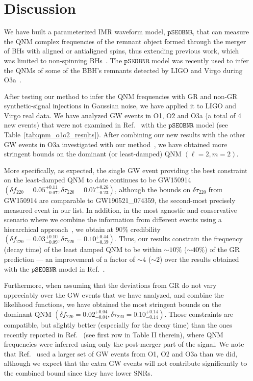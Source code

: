 \documentclass[twocolumn,prd,aps,superscriptaddress,preprintnumbers,tightenlines,showpacs,nofootinbib,eqsecnum,amsfonts,amsmath]{revtex4-1}
\newcommand{\df}[1]{\delta f_{\text{#1}}}
\newcommand{\dtau}[1]{\delta \tau_{\text{#1}}}
\newcommand{\pSEOB}{\texttt{pSEOBNR}}
\begin{document}



\section{Discussion}
\label{sec:discussion}
We have built a parameterized IMR waveform model, $\pSEOB$, that can 
measure the QNM complex frequencies of the remnant object formed through 
the merger of BHs with aligned or antialigned spins, thus extending  
previous work, which was limited to non-spinning BHs~\cite{Brito:2018rfr}. 
The $\pSEOB$ model was recently used to infer the QNMs of some of the 
BBH's remnants detected by LIGO and Virgo during O3a~\cite{Abbott:2020jks}. 

After testing our method to infer the QNM frequencies with GR and non-GR synthetic-signal 
injections in Gaussian noise, we have applied it to LIGO and Virgo real data. 
We have analyzed GW events in O1, O2 and O3a (a total of 4 new events) that were not examined in Ref.~\cite{Abbott:2020jks} 
with the $\pSEOB$ model (see Table~\ref{tab:qnm_o1o2_results}). After combining our new 
results with the other GW events in O3a investigated with our method~\cite{Abbott:2020jks}, 
we have obtained more stringent bounds on the dominant (or least-damped) QNM $(\ell=2,m=2)$.

More specifically, as expected, the single GW event providing the best constraint
on the least-damped QNM to date continues to be GW150914 $(\df{220}=0.05^{+0.11}_{-0.07}, 
\dtau{220}=0.07^{+0.26}_{-0.23})$, although the bounds on 
$\dtau{220}$ from GW150914 are comparable to GW190521\_074359, 
the second-most precisely measured event in our list.
In addition, in the most agnostic and
conservative scenario where we combine the information from different
events using a hierarchical approach~\cite{Zimmerman:2019wzo,Isi:2019asy}, we obtain 
at $90\%$ credibility $(\df{220}=0.03^{+0.10}_{-0.09}, \dtau{220}=0.10^{+0.44}_{-0.39})$. Thus, 
our results constrain the frequency (decay time) of the least damped QNM to be within $\sim
10\%$ ($\sim 40\%$) of the GR prediction --- an improvement of a factor of $\sim 4$ ($\sim 2$) 
over the results obtained with the $\pSEOB$ model in Ref.~\cite{Abbott:2020jks}.

Furthermore, when assuming that the deviations from GR do not vary appreciably over the GW events 
that we have analyzed, and combine the likelihood functions, we have obtained the most stringent bounds  
on the dominant QNM $(\df{220}=0.02^{+0.04}_{-0.04}, \dtau{220}=0.10^{+0.14}_{-0.14})$. Those 
constraints are compatible, but slightly better (especially for the decay time) than the ones recently reported in Ref.~\cite{Carullo:2021dui} 
(see first row in Table II therein), where QNM frequencies were inferred using only the post-merger part of 
the signal. We note that Ref.~\cite{Carullo:2021dui} used a larger set of GW events from O1, O2 and O3a than we did, although we expect 
that the extra GW events will not contribute significantly to the combined bound since they have lower SNRs.
\end{document}
